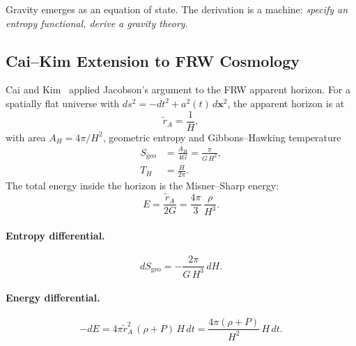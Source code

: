 \documentclass[twocolumn,a4paper,aps,prd,twocolumn,showpacs,notitlepage,superscriptaddress,nofootinbib]{article}
\begin{document}
Gravity emerges as an equation of state.  The derivation is a machine:
\emph{specify an entropy functional, derive a gravity theory}.

\subsection{Cai--Kim Extension to FRW Cosmology}

Cai and Kim~\citep{CaiKim2005} applied Jacobson's argument to the FRW
apparent horizon.  For a spatially flat universe with
$ds^2 = -dt^2 + a^2(t)\,d\mathbf{x}^2$, the apparent horizon is at
\begin{equation}
\tilde{r}_A = \frac{1}{H},
\label{eq:apparent_horizon}
\end{equation}
with area $A_H = 4\pi/H^2$, geometric entropy and Gibbons--Hawking temperature~\citep{GibbonsHawking1977}
\begin{align}
S_\mathrm{geo} &= \frac{A_H}{4G} = \frac{\pi}{G\,H^2}, \label{eq:Sgeo}\\
T_H &= \frac{H}{2\pi}. \label{eq:T_horizon}
\end{align}
The total energy inside the horizon is the Misner--Sharp energy:
\begin{equation}
E = \frac{\tilde{r}_A}{2G} = \frac{4\pi}{3}\,\frac{\rho}{H^3}.
\label{eq:misner_sharp}
\end{equation}

\paragraph{Entropy differential.}
\begin{equation}
dS_\mathrm{geo} = -\frac{2\pi}{G\,H^3}\,dH.
\label{eq:dSgeo}
\end{equation}

\paragraph{Energy differential.}
\begin{equation}
-dE = 4\pi\tilde{r}_A^2\,(\rho + P)\,H\,dt
= \frac{4\pi(\rho + P)}{H^2}\,H\,dt.
\label{eq:dE}
\end{equation}
\end{document}
